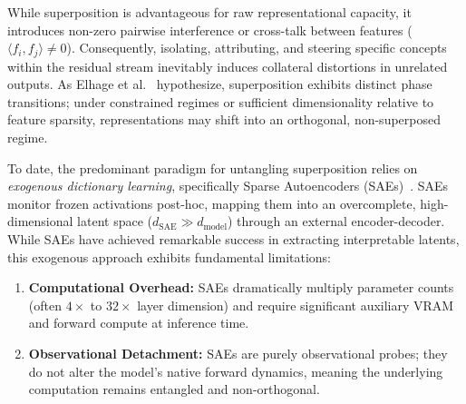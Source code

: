 \documentclass[10pt,twocolumn,letterpaper]{article}
\begin{document}
While superposition is advantageous for raw representational capacity, it introduces non-zero pairwise interference or cross-talk between features ($\langle f_i, f_j \rangle \neq 0$). Consequently, isolating, attributing, and steering specific concepts within the residual stream inevitably induces collateral distortions in unrelated outputs. As Elhage et al.~\cite{elhage2022toy} hypothesize, superposition exhibits distinct phase transitions; under constrained regimes or sufficient dimensionality relative to feature sparsity, representations may shift into an orthogonal, non-superposed regime.

To date, the predominant paradigm for untangling superposition relies on \textit{exogenous dictionary learning}, specifically Sparse Autoencoders (SAEs)~\cite{bricken2023towards,cunningham2023sparse,gao2024scaling}. SAEs monitor frozen activations post-hoc, mapping them into an overcomplete, high-dimensional latent space ($d_{\text{SAE}} \gg d_{\text{model}}$) through an external encoder-decoder. While SAEs have achieved remarkable success in extracting interpretable latents, this exogenous approach exhibits fundamental limitations:
\begin{enumerate}
    \item \textbf{Computational Overhead:} SAEs dramatically multiply parameter counts (often $4\times$ to $32\times$ layer dimension) and require significant auxiliary VRAM and forward compute at inference time.
    \item \textbf{Observational Detachment:} SAEs are purely observational probes; they do not alter the model's native forward dynamics, meaning the underlying computation remains entangled and non-orthogonal.
\end{enumerate}
\end{document}
